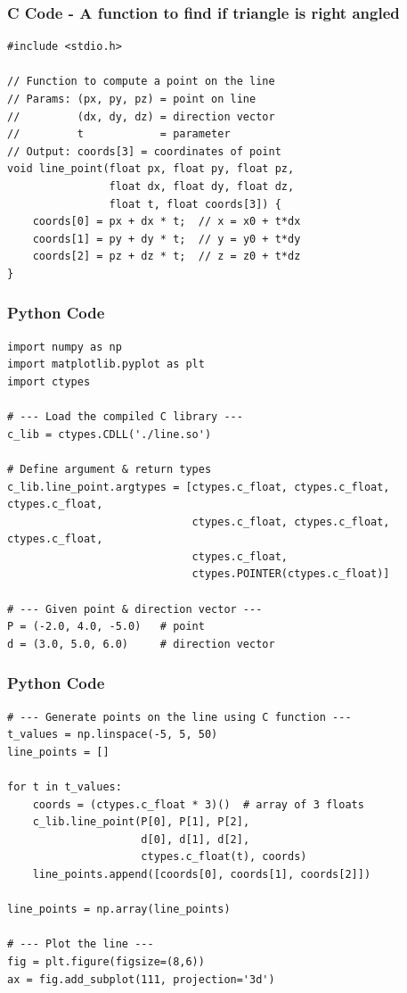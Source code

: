 \documentclass{beamer}
\begin{document}
\begin{frame}[fragile]
    \frametitle{C Code - A function to find if triangle is right angled }

    \begin{lstlisting}
#include <stdio.h>

// Function to compute a point on the line
// Params: (px, py, pz) = point on line
//         (dx, dy, dz) = direction vector
//         t            = parameter
// Output: coords[3] = coordinates of point
void line_point(float px, float py, float pz,
                float dx, float dy, float dz,
                float t, float coords[3]) {
    coords[0] = px + dx * t;  // x = x0 + t*dx
    coords[1] = py + dy * t;  // y = y0 + t*dy
    coords[2] = pz + dz * t;  // z = z0 + t*dz
}
     \end{lstlisting}
\end{frame}

\begin{frame}[fragile]
    \frametitle{Python Code}
    \begin{lstlisting}
import numpy as np
import matplotlib.pyplot as plt
import ctypes

# --- Load the compiled C library ---
c_lib = ctypes.CDLL('./line.so')

# Define argument & return types
c_lib.line_point.argtypes = [ctypes.c_float, ctypes.c_float, ctypes.c_float,
                             ctypes.c_float, ctypes.c_float, ctypes.c_float,
                             ctypes.c_float,
                             ctypes.POINTER(ctypes.c_float)]

# --- Given point & direction vector ---
P = (-2.0, 4.0, -5.0)   # point
d = (3.0, 5.0, 6.0)     # direction vector

    \end{lstlisting}
\end{frame}

\begin{frame}[fragile]
    \frametitle{Python Code}
    \begin{lstlisting}
# --- Generate points on the line using C function ---
t_values = np.linspace(-5, 5, 50)
line_points = []

for t in t_values:
    coords = (ctypes.c_float * 3)()  # array of 3 floats
    c_lib.line_point(P[0], P[1], P[2],
                     d[0], d[1], d[2],
                     ctypes.c_float(t), coords)
    line_points.append([coords[0], coords[1], coords[2]])

line_points = np.array(line_points)

# --- Plot the line ---
fig = plt.figure(figsize=(8,6))
ax = fig.add_subplot(111, projection='3d')
    \end{lstlisting}
\end{frame}
\end{document}
